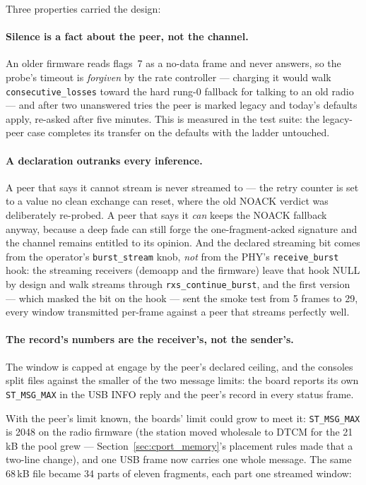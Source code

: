 Three properties carried the design:

\paragraph{Silence is a fact about the peer, not the channel.} An
older firmware reads flags~7 as a no-data frame and never answers, so
the probe's timeout is \emph{forgiven} by the rate controller ---
charging it would walk \texttt{consecutive\_losses} toward the hard
rung-0 fallback for talking to an old radio --- and after two
unanswered tries the peer is marked legacy and today's defaults apply,
re-asked after five minutes. This is measured in the test suite: the
legacy-peer case completes its transfer on the defaults with the
ladder untouched.

\paragraph{A declaration outranks every inference.} A peer that says
it cannot stream is never streamed to --- the retry counter is set to a
value no clean exchange can reset, where the old NOACK verdict was
deliberately re-probed. A peer that says it \emph{can} keeps the NOACK
fallback anyway, because a deep fade can still forge the
one-fragment-acked signature and the channel remains entitled to its
opinion. And the declared streaming bit comes from the operator's
\texttt{burst\_stream} knob, \emph{not} from the PHY's
\texttt{receive\_burst} hook: the streaming receivers (demoapp and the
firmware) leave that hook NULL by design and walk streams through
\texttt{rxs\_continue\_burst}, and the first version --- which masked
the bit on the hook --- sent the smoke test from 5 frames to 29,
every window transmitted per-frame against a peer that streams
perfectly well.

\paragraph{The record's numbers are the receiver's, not the
sender's.} The window is capped at engage by the peer's declared
ceiling, and the consoles split files against the smaller of the two
message limits: the board reports its own \texttt{ST\_MSG\_MAX} in the
USB INFO reply and the peer's record in every status frame.

With the peer's limit known, the boards' limit could grow to meet it:
\texttt{ST\_MSG\_MAX} is 2048 on the radio firmware (the station
moved wholesale to DTCM for the 21\,kB the pool grew ---
Section~\ref{sec:cport_memory}'s placement rules made that a two-line
change), and one USB frame now carries one whole message. The same
68\,kB file became 34 parts of eleven fragments, each part one
streamed window:

